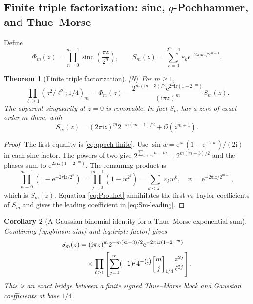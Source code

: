 \documentclass[11pt,oneside]{article}
\newtheorem{theorem}{Theorem}[section]
\newtheorem{corollary}[theorem]{Corollary}
\theoremstyle{definition}
\theoremstyle{remark}
\newcommand{\sinc}{\operatorname{sinc}}
\newcommand{\e}{\mathrm e}
\newcommand{\ii}{\mathrm i}
\newcommand{\bigO}{\mathcal O}
\newcommand{\qbinom}[3]{\genfrac{[}{]}{0pt}{}{#1}{#2}_{#3}}
\newcommand{\statusN}{\textsf{[N]}}
\begin{document}
\subsection{Finite triple factorization: sinc, $q$-Pochhammer, and Thue--Morse}
Define
\begin{equation}
 \Phi_m(z)=\prod_{n=0}^{m-1}\sinc\!\left(\frac{\pi z}{2^n}\right),
 \qquad
 S_m(z)=\sum_{k=0}^{2^m-1}\varepsilon_k
 \e^{-2\pi\ii kz/2^{m-1}}.                                \label{eq:Phi-m-Sm}
\end{equation}

\begin{theorem}[Finite triple factorization]\label{thm:triple-factor}
\statusN\ For $m\ge1$,
\begin{equation}
 \boxed{
 \prod_{\ell\ge1}(z^2/\ell^2;1/4)_m
 =\Phi_m(z)
 =\frac{2^{m(m-3)/2}\e^{2\pi\ii z(1-2^{-m})}}{(\ii\pi z)^m}
 S_m(z).}                                                   \label{eq:triple-factor}
\end{equation}
The apparent singularity at $z=0$ is removable.  In fact $S_m$ has a zero of exact order
$m$ there, with
\begin{equation}
 S_m(z)=(2\pi\ii z)^m2^{-m(m-1)/2}+\bigO(z^{m+1}).         \label{eq:Sm-leading}
\end{equation}
\end{theorem}

\begin{proof}
The first equality is \eqref{eq:qpoch-finite}.  Use
$\sin w=\e^{\ii w}(1-\e^{-2\ii w})/(2\ii)$ in each sinc factor.  The powers of two give
$2^{\sum_{n<m}n-m}=2^{m(m-3)/2}$ and the phases sum to
$\e^{2\pi\ii z(1-2^{-m})}$.  The remaining product is
\[
 \prod_{n=0}^{m-1}(1-\e^{-2\pi\ii z/2^n})
 =\prod_{j=0}^{m-1}(1-w^{2^j})=\sum_{k<2^m}\varepsilon_kw^k,
 \quad w=\e^{-2\pi\ii z/2^{m-1}},
\]
which is $S_m(z)$.  Equation \eqref{eq:Prouhet} annihilates the first $m$ Taylor
coefficients of $S_m$ and gives the leading coefficient in \eqref{eq:Sm-leading}.
\end{proof}

\begin{corollary}[A Gaussian-binomial identity for a Thue--Morse exponential sum]
Combining \eqref{eq:qbinom-sinc} and \eqref{eq:triple-factor} gives
\begin{align}
 S_m(z)
 &=(\ii\pi z)^m2^{-m(m-3)/2}\e^{-2\pi\ii z(1-2^{-m})} \notag\\
 &\quad\times
 \prod_{\ell\ge1}
 \left[
  \sum_{j=0}^{m}(-1)^j4^{-\binom j2}\qbinom mj{1/4}
  \frac{z^{2j}}{\ell^{2j}}
 \right].                                                  \label{eq:TM-qbinom}
\end{align}
This is an exact bridge between a finite signed Thue--Morse block and Gaussian
coefficients at base $1/4$.
\end{corollary}
\end{document}
